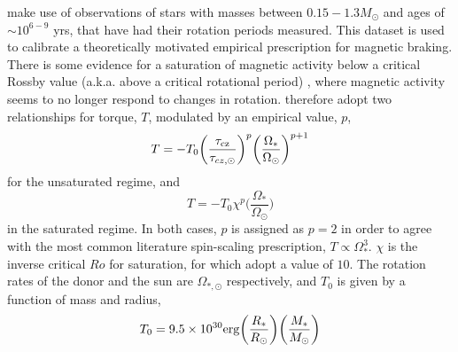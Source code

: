 \citet{matt2015} make use of observations of stars with masses between $0.15 - 1.3 M_\odot$ and ages of $\sim 10^{6-9}$ yrs, that have had their rotation periods measured. This dataset is used to calibrate a theoretically motivated empirical prescription for magnetic braking. There is some evidence for a saturation of magnetic activity below a critical Rossby value (a.k.a. above a critical rotational period) \citep{reiners2009}, where magnetic activity seems to no longer respond to changes in rotation. \citet{matt2015} therefore adopt two relationships for torque, $T$, modulated by an empirical value, $p$,
\begin{equation}
    T = -T_0 \bigg( \frac{\tau_{\rm cz}}{\tau_{cz,\odot}} \bigg)^p \bigg( \frac{\Omega_{*}}{\Omega_{\odot}} \bigg)^{p+1}
\end{equation}
for the unsaturated regime, and
\begin{equation}
    T = -T_0 \chi^p \bigg( \frac{\Omega_*}{\Omega_\odot} \bigg)
\end{equation}
in the saturated regime. In both cases, $p$ is assigned as $p = 2$ in order to agree with the most common literature spin-scaling prescription, $T \propto \Omega_*^3$.
$\chi$ is the inverse critical $Ro$ for saturation, for which \citet{matt2015} adopt a value of $10$.
The rotation rates of the donor and the sun are $\Omega_{*,\odot}$ respectively, and $T_0$ is given by a function of mass and radius,
\begin{equation}
    T_0 = 9.5 \times 10^{30} {\rm erg} \bigg(\frac{R_*}{R_\odot} \bigg) \bigg(\frac{M_*}{M_\odot} \bigg)
\end{equation}

